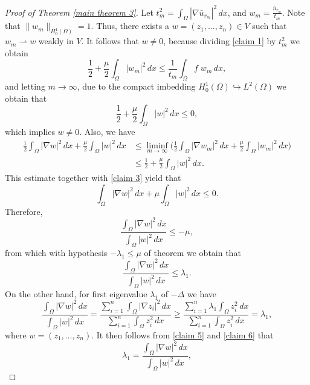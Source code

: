 \documentclass[reqno]{amsart}
\begin{document}
\begin{proof}[Proof of Theorem \ref{main theorem 3}]
Let \( t^2_m=\int_{\Omega}|\nabla \bar{u}_{r_m}|^2\,dx\), and
\( w_m=\frac{\bar{u}_{r_m}}{t_m}\).
Note that \(\rVert w_m\rVert_{H_0^1(\Omega)} =1\). Thus, there exists a
\(w=(z_1,\dots,z_n)\in V\) such that \(w_m \rightharpoonup w\) weakly in \(V\).
It follows that \(w \neq 0\), because  dividing \eqref{claim 1} by  \(t^2_m\)
we obtain
\begin{equation}\label{claim 2}
 \frac{1}{2}+\frac{\mu}{2}\int_\Omega   |w_m|^{2}\,dx
 \leq \frac{1}{t_m}\int_{\Omega} f\;w_m\,dx,
\end{equation}
and letting \(m\to \infty\), due to the compact imbedding
\(H_0^1(\Omega)\hookrightarrow L^2(\Omega)\) we obtain that
\begin{equation}\label{claim 3}
 \frac{1}{2}+\frac{\mu}{2}\int_\Omega   |w|^{2}\,dx \leq 0,
\end{equation}
which implies \(w\neq 0\). Also, we have
\begin{align*}
  \frac{1}{2}\int_{\Omega} |\nabla w|^2\,dx+\frac{\mu}{2}\int_\Omega  |w|^{2}\,dx
  &\leq \liminf_{m\to \infty}\big(\frac{1}{2}\int_{\Omega} |\nabla w_m|^2\,dx+\frac{\mu}{2}\int_\Omega  |w_m|^{2}\,dx\big)\\
  &\leq \frac{1}{2}+\frac{\mu}{2}\int_\Omega   |w|^{2}\,dx.
\end{align*}
This estimate  together with  \eqref{claim 3} yield that
\[
  \int_{\Omega} |\nabla w|^2\,dx+{\mu}\int_\Omega  |w|^{2}\,dx \leq 0.
\]
Therefore,
\begin{equation}\label{claim 4}
  \frac{\int_{\Omega} |\nabla w|^2\,dx}{\int_\Omega  |w|^{2} \,dx} \leq -\mu,
\end{equation}
from which  with hypothesis \(-\lambda_1\leq \mu\) of theorem we obtain that
\begin{equation}\label{claim 5}
  \frac{\int_{\Omega} |\nabla w|^2\,dx}{\int_\Omega  |w|^{2} \,dx} \leq \lambda_1.
\end{equation}
On the other hand, for  first eigenvalue \(\lambda_1\) of \(-\Delta\) we have
\begin{equation}\label{claim 6}
  \frac{\int_{\Omega} |\nabla w|^2\,dx}{\int_\Omega  |w|^{2}\,dx}= \frac{\sum_{i=1}^n\int_{\Omega} |\nabla z_i|^2\,dx}{\sum_{i=1}^n\int_\Omega  z_i^{2}\,dx} \geq \frac{\sum_{i=1}^n \lambda_1 \int_\Omega  z_i^{2}\,dx}{\sum_{i=1}^n\int_\Omega  z_i^{2} \,dx}=\lambda_1,
\end{equation}
where $w=(z_1,\dots,z_n)$.
It then follows from \eqref{claim 5}  and \eqref{claim 6} that
\begin{equation}\label{claim 7}
   \lambda_1 =  \frac{\int_{\Omega} |\nabla w|^2\,dx}{\int_\Omega  |w|^{2}\,dx},

\end{equation}
\end{proof}
\end{document}
